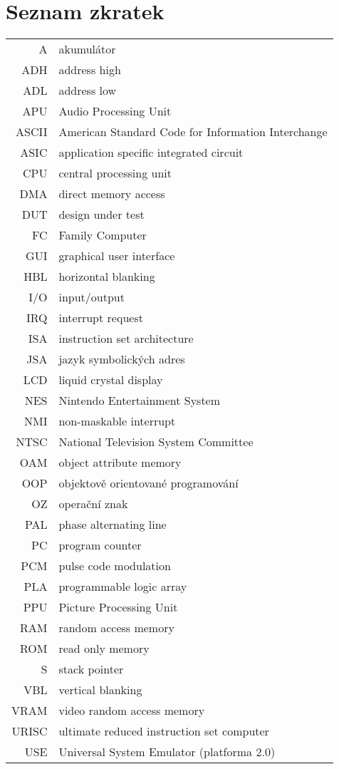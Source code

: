 \documentclass[czech,bachelor,unicode]{ctufit-thesis}
\theoremstyle{plain}
\theoremstyle{definition}
\theoremstyle{remark}
\numberwithin{theorem}{chapter}
\begin{document}
\chapter{Seznam zkratek}
\begin{tabular}{rl}
A 	 & akumulátor \\
ADH &	 address high \\
ADL &	 address low \\
APU &	 Audio Processing Unit\\
ASCII & American Standard Code for Information Interchange \\
ASIC &	 application specific integrated circuit \\
CPU &	 central processing unit\\
DMA & direct memory access \\
DUT & design under test\\
FC &	 Family Computer\\
GUI &	 graphical user interface \\
HBL & horizontal blanking \\
I/O &	 input/output \\
IRQ &	 interrupt request\\
ISA &	 instruction set architecture\\
JSA &	 jazyk symbolických adres\\
LCD & liquid crystal display \\
NES &	 Nintendo Entertainment System\\
NMI &	 non-maskable interrupt\\
NTSC &	 National Television System Committee\\
OAM &	 object attribute memory\\
OOP &	 objektově orientované programování \\
OZ &	 operační znak \\
PAL &	 phase alternating line\\
PC &	 program counter \\
PCM &    pulse code modulation \\
PLA &	 programmable logic array \\
PPU &	 Picture Processing Unit\\
RAM &	 random access memory\\
ROM &	 read only memory\\
S &	 stack pointer \\
VBL & vertical blanking \\
VRAM &	 video random access memory \\
URISC & ultimate reduced instruction set computer \\
USE & Universal System Emulator (platforma 2.0) \\

\end{tabular}
\end{document}
